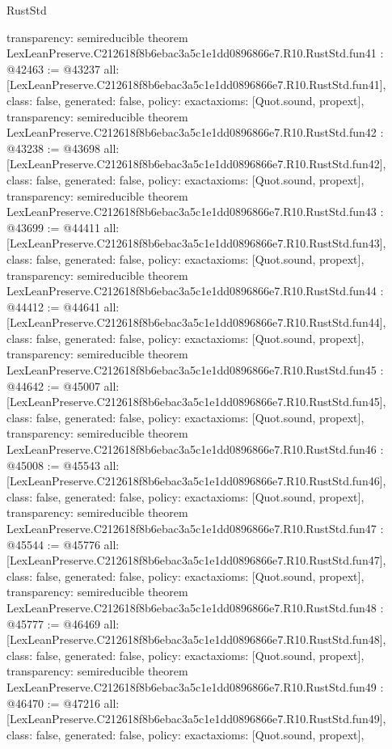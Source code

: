\begin{lexlean}{RustStd}
\begin{coremodule}
{  transparency: semireducible
}
theorem LexLeanPreserve.C212618f8b6ebac3a5c1e1dd0896866e7.R10.RustStd.fun41 : @42463 := @43237 {
  all: [LexLeanPreserve.C212618f8b6ebac3a5c1e1dd0896866e7.R10.RustStd.fun41],
  class: false,
  generated: false,
  policy: exact{axioms: [Quot.sound, propext]},
  transparency: semireducible
}
theorem LexLeanPreserve.C212618f8b6ebac3a5c1e1dd0896866e7.R10.RustStd.fun42 : @43238 := @43698 {
  all: [LexLeanPreserve.C212618f8b6ebac3a5c1e1dd0896866e7.R10.RustStd.fun42],
  class: false,
  generated: false,
  policy: exact{axioms: [Quot.sound, propext]},
  transparency: semireducible
}
theorem LexLeanPreserve.C212618f8b6ebac3a5c1e1dd0896866e7.R10.RustStd.fun43 : @43699 := @44411 {
  all: [LexLeanPreserve.C212618f8b6ebac3a5c1e1dd0896866e7.R10.RustStd.fun43],
  class: false,
  generated: false,
  policy: exact{axioms: [Quot.sound, propext]},
  transparency: semireducible
}
theorem LexLeanPreserve.C212618f8b6ebac3a5c1e1dd0896866e7.R10.RustStd.fun44 : @44412 := @44641 {
  all: [LexLeanPreserve.C212618f8b6ebac3a5c1e1dd0896866e7.R10.RustStd.fun44],
  class: false,
  generated: false,
  policy: exact{axioms: [Quot.sound, propext]},
  transparency: semireducible
}
theorem LexLeanPreserve.C212618f8b6ebac3a5c1e1dd0896866e7.R10.RustStd.fun45 : @44642 := @45007 {
  all: [LexLeanPreserve.C212618f8b6ebac3a5c1e1dd0896866e7.R10.RustStd.fun45],
  class: false,
  generated: false,
  policy: exact{axioms: [Quot.sound, propext]},
  transparency: semireducible
}
theorem LexLeanPreserve.C212618f8b6ebac3a5c1e1dd0896866e7.R10.RustStd.fun46 : @45008 := @45543 {
  all: [LexLeanPreserve.C212618f8b6ebac3a5c1e1dd0896866e7.R10.RustStd.fun46],
  class: false,
  generated: false,
  policy: exact{axioms: [Quot.sound, propext]},
  transparency: semireducible
}
theorem LexLeanPreserve.C212618f8b6ebac3a5c1e1dd0896866e7.R10.RustStd.fun47 : @45544 := @45776 {
  all: [LexLeanPreserve.C212618f8b6ebac3a5c1e1dd0896866e7.R10.RustStd.fun47],
  class: false,
  generated: false,
  policy: exact{axioms: [Quot.sound, propext]},
  transparency: semireducible
}
theorem LexLeanPreserve.C212618f8b6ebac3a5c1e1dd0896866e7.R10.RustStd.fun48 : @45777 := @46469 {
  all: [LexLeanPreserve.C212618f8b6ebac3a5c1e1dd0896866e7.R10.RustStd.fun48],
  class: false,
  generated: false,
  policy: exact{axioms: [Quot.sound, propext]},
  transparency: semireducible
}
theorem LexLeanPreserve.C212618f8b6ebac3a5c1e1dd0896866e7.R10.RustStd.fun49 : @46470 := @47216 {
  all: [LexLeanPreserve.C212618f8b6ebac3a5c1e1dd0896866e7.R10.RustStd.fun49],
  class: false,
  generated: false,
  policy: exact{axioms: [Quot.sound, propext]},
}
\end{coremodule}
\end{lexlean}
